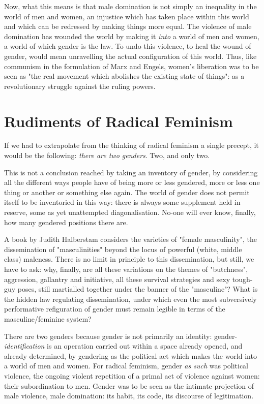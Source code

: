 \documentclass[ebook]{memoir}
\begin{document}
Now, what this means is that male domination is not simply an inequality in the world of men and women, an injustice which has taken place within this world and which can be redressed by making things more equal. The violence of male domination has wounded the world by making it \emph{into} a world of men and women, a world of which gender is the law. To undo this violence, to heal the wound of gender, would mean unravelling the actual configuration of this world. Thus, like communism in the formulation of Marx and Engels, women's liberation was to be seen as "the real movement which abolishes the existing state of things": as a revolutionary struggle against the ruling powers.

\section{Rudiments of Radical Feminism}

If we had to extrapolate from the thinking of radical feminism a single precept, it would be the following: \emph{there are two genders}. Two, and only two.

This is not a conclusion reached by taking an inventory of gender, by considering all the different ways people have of being more or less gendered, more or less one thing or another or something else again. The world of gender does not permit itself to be inventoried in this way: there is always some supplement held in reserve, some as yet unattempted diagonalisation. No-one will ever know, finally, how many gendered positions there are.

A book by Judith Halberstam considers the varieties of "female masculinity", the dissemination of "masculinities" beyond the locus of powerful (white, middle class) maleness. There is no limit in principle to this dissemination, but still, we have to ask: why, finally, are all these variations on the themes of "butchness", aggression, gallantry and initiative, all these survival strategies and sexy tough-guy poses, still martialled together under the banner of the "masculine"? What is the hidden law regulating dissemination, under which even the most subversively performative refiguration of gender must remain legible in terms of the masculine/feminine system?

There are two genders because gender is not primarily an identity: gender-\emph{identification} is an operation carried out within a space already opened, and already determined, by gendering as the political act which makes the world into a world of men and women. For radical feminism, gender \emph{as such} was political violence, the ongoing violent repetition of a primal act of violence against women: their subordination to men. Gender was to be seen as the intimate projection of male violence, male domination: its habit, its code, its discourse of legitimation.
\end{document}
